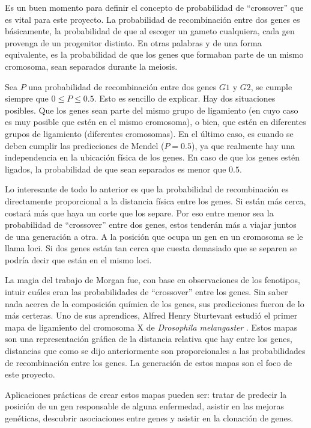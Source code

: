 \documentclass{article}
\begin{document}
	Es un buen momento para definir el concepto de probabilidad de ``crossover'' que es vital para este proyecto. La probabilidad de recombinación entre dos genes es básicamente, la probabilidad de que al escoger un gameto cualquiera, cada gen provenga de un progenitor distinto. En otras palabras y de una forma equivalente, es la probabilidad de que los genes que formaban parte de un mismo cromosoma, sean separados durante la meiosis. 
	
	Sea $P$ una probabilidad de recombinación entre dos genes $G1$ y $G2$, se cumple siempre que $0 \le P \le 0.5$. Esto es sencillo de explicar. Hay dos situaciones posibles. Que los genes sean parte del mismo grupo de ligamiento (en cuyo caso es muy posible que estén en el mismo cromosoma), o bien, que estén en diferentes grupos de ligamiento (diferentes cromosomas). En el último caso, es cuando se deben cumplir las predicciones de Mendel ($P = 0.5$), ya que realmente hay una independencia en la ubicación física de los genes. En caso de que los genes estén ligados, la probabilidad de que sean separados es menor que $0.5$.  
	
	Lo interesante de todo lo anterior es que la probabilidad de recombinación es directamente proporcional a la distancia física entre los genes. Si están más cerca, costará más que haya un corte que los separe. Por eso entre menor sea la probabilidad de ``crossover'' entre dos genes, estos tenderán más a viajar juntos de una generación a otra. A la posición que ocupa un gen en un cromosoma se le llama loci. Si dos genes están tan cerca que cuesta demasiado que se separen se podría decir que están en el mismo loci.
	
	La magia del trabajo de Morgan fue, con base en observaciones de los fenotipos, intuir cuáles eran las probabilidades de ``crossover'' entre los genes. Sin saber nada acerca de la composición química de los genes, sus predicciones fueron de lo más certeras. Uno de sus aprendices, Alfred Henry Sturtevant estudió el primer mapa de ligamiento del cromosoma X de \emph{Drosophila melangaster} \cite{sturtevant1913linear}. Estos mapas son una representación gráfica de la distancia relativa que hay entre los genes, distancias que como se dijo anteriormente son proporcionales a las probabilidades de recombinación entre los genes. La generación de estos mapas son el foco de este proyecto.
	
	Aplicaciones prácticas de crear estos mapas pueden ser: tratar de predecir la posición de un gen responsable de alguna enfermedad, asistir en las mejoras genéticas, descubrir asociaciones entre genes y asistir en la clonación de genes.
\end{document}
